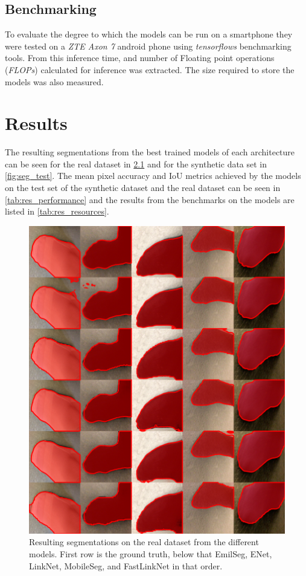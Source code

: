 \documentclass{kththesis}
\begin{document}
\section{Benchmarking}
To evaluate the degree to which the models can be run on a smartphone they were
tested on a \textit{ZTE Axon 7} android phone using \textit{tensorflows}
benchmarking tools. From this inference time, and number of Floating point
operations (\textit{FLOPs}) calculated for inference was extracted. The size
required to store the models was also measured. 

\chapter{Results}
The resulting segmentations from the best trained models of each architecture
can be seen for the real dataset in \cref{fig:seg_real} and for the synthetic
data set in \cref{fig:seg_test}. The mean pixel accuracy and IoU metrics
achieved by the models on the test set of the synthetic dataset and the real
dataset can be seen in \cref{tab:res_performance} and the results from the
benchmarks on the models are listed in \cref{tab:res_resources}.
\begin{figure}[h]
  \centering
  \includegraphics[width=\textwidth]{real_color}
  \caption{Resulting segmentations on the real dataset from the different models. First row is the ground
    truth, below that EmilSeg, ENet, LinkNet, MobileSeg, and FastLinkNet in that
    order.}
  \label{fig:seg_real}
  \end{figure}
\end{document}
